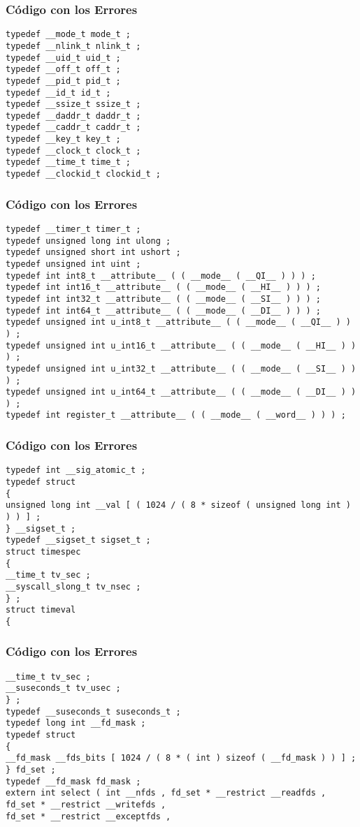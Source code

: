 \documentclass{beamer}
\begin{document}
\begin{frame}[fragile]
\frametitle{C\'odigo con los Errores}
\begin{lstlisting}[style=CStyle]
typedef __mode_t mode_t ; 
typedef __nlink_t nlink_t ; 
typedef __uid_t uid_t ; 
typedef __off_t off_t ; 
typedef __pid_t pid_t ; 
typedef __id_t id_t ; 
typedef __ssize_t ssize_t ; 
typedef __daddr_t daddr_t ; 
typedef __caddr_t caddr_t ; 
typedef __key_t key_t ; 
typedef __clock_t clock_t ; 
typedef __time_t time_t ; 
typedef __clockid_t clockid_t ; 
\end{lstlisting}
\end{frame}
\begin{frame}[fragile]
\frametitle{C\'odigo con los Errores}
\begin{lstlisting}[style=CStyle]
typedef __timer_t timer_t ; 
typedef unsigned long int ulong ; 
typedef unsigned short int ushort ; 
typedef unsigned int uint ; 
typedef int int8_t __attribute__ ( ( __mode__ ( __QI__ ) ) ) ; 
typedef int int16_t __attribute__ ( ( __mode__ ( __HI__ ) ) ) ; 
typedef int int32_t __attribute__ ( ( __mode__ ( __SI__ ) ) ) ; 
typedef int int64_t __attribute__ ( ( __mode__ ( __DI__ ) ) ) ; 
typedef unsigned int u_int8_t __attribute__ ( ( __mode__ ( __QI__ ) ) ) ; 
typedef unsigned int u_int16_t __attribute__ ( ( __mode__ ( __HI__ ) ) ) ; 
typedef unsigned int u_int32_t __attribute__ ( ( __mode__ ( __SI__ ) ) ) ; 
typedef unsigned int u_int64_t __attribute__ ( ( __mode__ ( __DI__ ) ) ) ; 
typedef int register_t __attribute__ ( ( __mode__ ( __word__ ) ) ) ; 
\end{lstlisting}
\end{frame}
\begin{frame}[fragile]
\frametitle{C\'odigo con los Errores}
\begin{lstlisting}[style=CStyle]
typedef int __sig_atomic_t ; 
typedef struct 
{ 
unsigned long int __val [ ( 1024 / ( 8 * sizeof ( unsigned long int ) ) ) ] ; 
} __sigset_t ; 
typedef __sigset_t sigset_t ; 
struct timespec 
{ 
__time_t tv_sec ; 
__syscall_slong_t tv_nsec ; 
} ; 
struct timeval 
{ 
\end{lstlisting}
\end{frame}
\begin{frame}[fragile]
\frametitle{C\'odigo con los Errores}
\begin{lstlisting}[style=CStyle]
__time_t tv_sec ; 
__suseconds_t tv_usec ; 
} ; 
typedef __suseconds_t suseconds_t ; 
typedef long int __fd_mask ; 
typedef struct 
{ 
__fd_mask __fds_bits [ 1024 / ( 8 * ( int ) sizeof ( __fd_mask ) ) ] ; 
} fd_set ; 
typedef __fd_mask fd_mask ; 
extern int select ( int __nfds , fd_set * __restrict __readfds , 
fd_set * __restrict __writefds , 
fd_set * __restrict __exceptfds , 
\end{lstlisting}
\end{frame}
\end{document}
